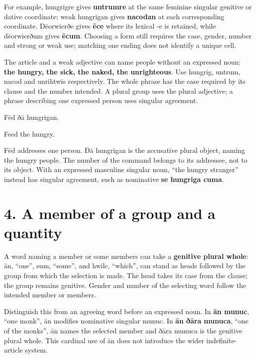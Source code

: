 For example, hungrigre gives \textbf{untrumre} at the same feminine singular genitive or dative coordinate; weak hungrigan gives \textbf{nacodan} at each corresponding coordinate. Dēorwierðe gives \textbf{ēce} where its lexical -e is retained, while dēorwierðum gives \textbf{ēcum}. Choosing a form still requires the case, gender, number and strong or weak use; matching one ending does not identify a unique cell.

The article and a weak adjective can name people without an expressed noun: \textbf{the hungry, the sick, the naked, the unrighteous}. Use hungrig, untrum, nacod and unrihtwīs respectively. The whole phrase has the case required by its clause and the number intended. A plural group uses the plural adjective; a phrase describing one expressed person uses singular agreement.

Fēd ðā hungrigan.

Feed the hungry.

Fēd addresses one person. Ðā hungrigan is the accusative plural object, naming the hungry people. The number of the command belongs to its addressee, not to its object. With an expressed masculine singular noun, “the hungry stranger” instead has singular agreement, such as nominative \textbf{se hungriga cuma}.

\section*{4. A member of a group and a quantity}

A word naming a member or some members can take a \textbf{genitive plural whole}: ān, “one”, sum, “some”, and hwilc, “which”, can stand as heads followed by the group from which the selection is made. The head takes its case from the clause; the group remains genitive. Gender and number of the selecting word follow the intended member or members.

Distinguish this from an agreeing word before an expressed noun. In \textbf{ān munuc}, “one monk”, ān modifies nominative singular munuc. In \textbf{ān ðāra munuca}, “one of the monks”, ān names the selected member and ðāra munuca is the genitive plural whole. This cardinal use of ān does not introduce the wider indefinite-article system.


